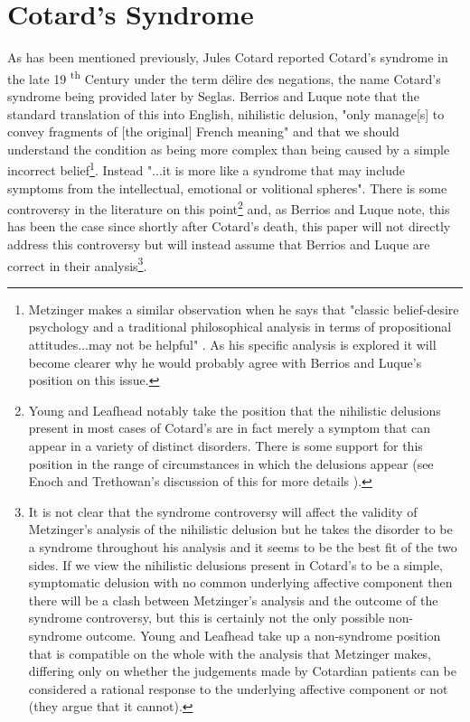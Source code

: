 \chapter{Cotard's Syndrome}
\label{chap:cotards}

As has been mentioned previously, Jules Cotard reported Cotard’s syndrome in the late 19
\textsuperscript{th} Century under the term d\"{e}lire des negations, the name Cotard’s syndrome being provided later by Seglas. Berrios and Luque\cite{berrios1995} note that the standard translation of this into English, nihilistic delusion, "only manage[s] to convey fragments of [the original] French meaning" and that we should understand the condition as being more complex than being caused by a simple incorrect belief\footnote{Metzinger makes a similar observation when he says that "classic belief-desire psychology and a traditional philosophical analysis in terms of propositional attitudes...may not be helpful" \cite[p. 458]{metzinger2003}. As his specific analysis is explored it will become clearer why he would probably agree with Berrios and Luque’s position on this issue.}. Instead "...it is more like a syndrome that may include symptoms from the intellectual, emotional or volitional spheres". There is some controversy in the literature on this point\footnote{Young and Leafhead \cite{young1995} notably take the position that the nihilistic delusions present in most cases of Cotard’s are in fact merely a symptom that can appear in a variety of distinct disorders. There is some support for this position in the range of circumstances in which the delusions appear (see Enoch and Trethowan’s discussion of this for more details \cite{enoch1991}).} and, as Berrios and Luque note, this has been the case since shortly after Cotard’s death, this paper will not directly address this controversy but will instead assume that Berrios and Luque are correct in their analysis\footnote{It is not clear that the syndrome controversy will affect the validity of Metzinger's analysis of the nihilistic delusion but he takes the disorder to be a syndrome throughout his analysis and it seems to be the best fit of the two sides. If we view the nihilistic delusions present in Cotard’s to be a simple, symptomatic delusion with no common underlying affective component then there will be a clash between Metzinger’s analysis and the outcome of the syndrome controversy, but this is certainly not the only possible non- syndrome outcome. Young and Leafhead take up a non-syndrome position that is compatible on the whole with the analysis that Metzinger makes, differing only on whether the judgements made by Cotardian patients can be considered a rational response to the underlying affective component or not (they argue that it cannot).}.

